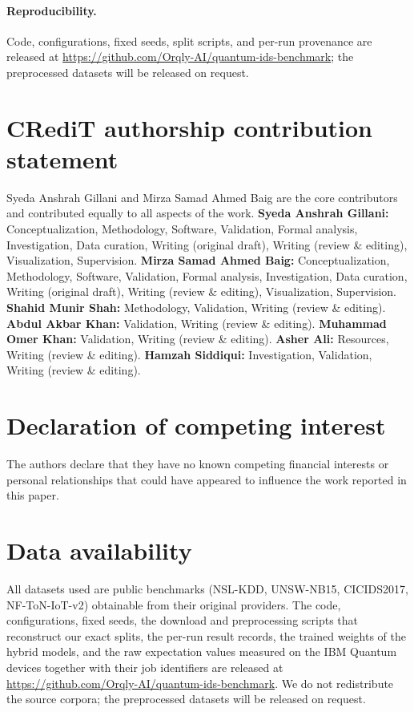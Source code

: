 \documentclass[preprint,11pt]{elsarticle}
\begin{document}
\paragraph{Reproducibility.} Code, configurations, fixed seeds, split scripts, and per-run provenance are
released at \url{https://github.com/Orqly-AI/quantum-ids-benchmark}; the preprocessed datasets will be
released on request.

\section*{CRediT authorship contribution statement}
Syeda Anshrah Gillani and Mirza Samad Ahmed Baig are the core contributors and contributed equally to
all aspects of the work. \textbf{Syeda Anshrah Gillani:} Conceptualization, Methodology, Software,
Validation, Formal analysis, Investigation, Data curation, Writing (original draft), Writing (review
\& editing), Visualization, Supervision. \textbf{Mirza Samad Ahmed Baig:} Conceptualization,
Methodology, Software, Validation, Formal analysis, Investigation, Data curation, Writing (original
draft), Writing (review \& editing), Visualization, Supervision. \textbf{Shahid Munir Shah:}
Methodology, Validation, Writing (review \& editing). \textbf{Abdul Akbar Khan:} Validation, Writing
(review \& editing). \textbf{Muhammad Omer Khan:} Validation, Writing (review \& editing).
\textbf{Asher Ali:} Resources, Writing (review \& editing). \textbf{Hamzah Siddiqui:} Investigation,
Validation, Writing (review \& editing).

\section*{Declaration of competing interest}
The authors declare that they have no known competing financial interests or personal relationships
that could have appeared to influence the work reported in this paper.

\section*{Data availability}
All datasets used are public benchmarks (NSL-KDD, UNSW-NB15, CICIDS2017, NF-ToN-IoT-v2) obtainable
from their original providers. The code, configurations, fixed seeds, the download and preprocessing
scripts that reconstruct our exact splits, the per-run result records, the trained weights of the
hybrid models, and the raw expectation values measured on the IBM Quantum devices together with their
job identifiers are released at \url{https://github.com/Orqly-AI/quantum-ids-benchmark}. We do not
redistribute the source corpora; the preprocessed datasets will be released on request.
\end{document}
